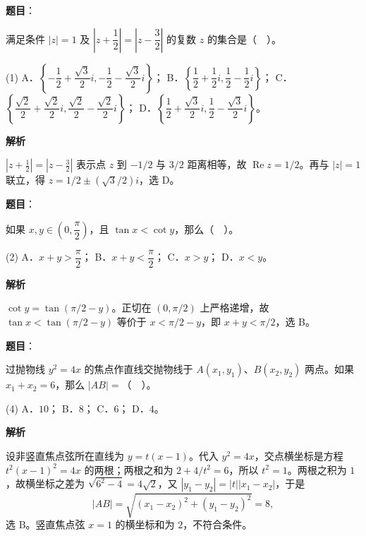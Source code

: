 \begin{answer}

\textbf{题目}：

满足条件 $|z|=1$ 及 $\left|z+\dfrac12\right|=\left|z-\dfrac32\right|$ 的复数 $z$ 的集合是（　）。

\begin{gkopts}(1)
\task A．$\left\{-\dfrac12+\dfrac{\sqrt3}{2}i,-\dfrac12-\dfrac{\sqrt3}{2}i\right\}$；
\task B．$\left\{\dfrac12+\dfrac12i,\dfrac12-\dfrac12i\right\}$；
\task C．$\left\{\dfrac{\sqrt2}{2}+\dfrac{\sqrt2}{2}i,\dfrac{\sqrt2}{2}-\dfrac{\sqrt2}{2}i\right\}$；
\task D．$\left\{\dfrac12+\dfrac{\sqrt3}{2}i,\dfrac12-\dfrac{\sqrt3}{2}i\right\}$。
\end{gkopts}

\textbf{解析}

$|z+\tfrac12|=|z-\tfrac32|$ 表示点 $z$ 到 $-1/2$ 与 $3/2$ 距离相等，故 $\operatorname{Re}z=1/2$。再与 $|z|=1$ 联立，得 $z=1/2\pm(\sqrt3/2)i$，选 D。


\end{answer}
\begin{answer}

\textbf{题目}：

如果 $x,y\in\left(0,\dfrac\pi2\right)$，且 $\tan x<\cot y$，那么（　）。

\begin{gkopts}(2)
\task A．$x+y>\dfrac\pi2$；
\task B．$x+y<\dfrac\pi2$；
\task C．$x>y$；
\task D．$x<y$。
\end{gkopts}

\textbf{解析}

$\cot y=\tan(\pi/2-y)$。正切在 $(0,\pi/2)$ 上严格递增，故 $\tan x<\tan(\pi/2-y)$ 等价于 $x<\pi/2-y$，即 $x+y<\pi/2$，选 B。


\end{answer}
\begin{answer}

\textbf{题目}：

过抛物线 $y^2=4x$ 的焦点作直线交抛物线于 $A(x_1,y_1)$、$B(x_2,y_2)$ 两点。如果 $x_1+x_2=6$，那么 $|AB|=$（　）。

\begin{gkopts}(4)
\task A．$10$；
\task B．$8$；
\task C．$6$；
\task D．$4$。
\end{gkopts}

\textbf{解析}

设非竖直焦点弦所在直线为 $y=t(x-1)$。代入 $y^2=4x$，交点横坐标是方程 $t^2(x-1)^2=4x$ 的两根；两根之和为 $2+4/t^2=6$，所以 $t^2=1$。两根之积为 $1$，故横坐标之差为 $\sqrt{6^2-4}=4\sqrt2$，又 $|y_1-y_2|=|t||x_1-x_2|$，于是
\nopagebreak[4]
\[
|AB|=\sqrt{(x_1-x_2)^2+(y_1-y_2)^2}=8,
\]
选 B。竖直焦点弦 $x=1$ 的横坐标和为 $2$，不符合条件。


\end{answer}
